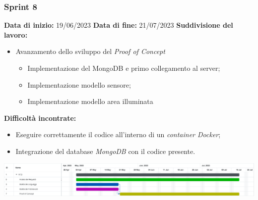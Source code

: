 \documentclass[a4paper, 12pt]{article}
\begin{document}
\subsubsection{Sprint 8}
\textbf{Data di inizio:} 19/06/2023\newline
\textbf{Data di fine:} 21/07/2023\newline
\newline
\textbf{Suddivisione del lavoro:}
\begin{itemize}
    \item Avanzamento dello sviluppo del \textit{Proof of Concept}
    \begin{itemize}
        \item Implementazione del MongoDB e primo collegamento al server;
        \item Implementazione modello sensore;
        \item Implementazione modello area illuminata
    \end{itemize}
\end{itemize}
\textbf{Difficoltà incontrate:}
\begin{itemize}
    \item Eseguire correttamente il codice all'interno di un \textit{container Docker};
    \item Integrazione del database \textit{MongoDB} con il codice presente.
\end{itemize}
\includegraphics[scale=0.24]{RTB_7.png}\newline
\newline
\end{document}
